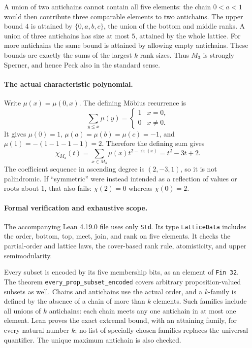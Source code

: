 \documentclass[11pt]{article}
\begin{document}
A union of two antichains cannot contain all five elements: the chain
$0<a<1$ would then contribute three comparable elements to two
antichains.  The upper bound $4$ is attained by
$\{0,a,b,c\}$, the union of the bottom and middle ranks.
A union of three antichains has size at most $5$, attained by the
whole lattice.  For more antichains the same bound is attained by
allowing empty antichains.  These bounds are exactly the sums of the
largest $k$ rank sizes.  Thus $M_3$ is strongly Sperner, and hence
Peck also in the standard sense.

\paragraph{The actual characteristic polynomial.}
Write $\mu(x)=\mu(0,x)$.  The defining M\"obius recurrence is
\[
\sum_{y\leq x}\mu(y)=
\begin{cases}1&x=0,\\0&x\ne0.\end{cases}
\]
It gives $\mu(0)=1$, $\mu(a)=\mu(b)=\mu(c)=-1$, and
$\mu(1)=-(1-1-1-1)=2$.  Therefore the defining sum gives
\[
\chi_{M_3}(t)=\sum_{x\in M_3}\mu(x)t^{2-\operatorname{rk}(x)}
=t^2-3t+2.
\]
The coefficient sequence in ascending degree is $(2,-3,1)$, so it
is not palindromic.  If ``symmetric'' were instead intended as a
reflection of values or roots about $1$, that also fails:
$\chi(2)=0$ whereas $\chi(0)=2$.

\paragraph{Formal verification and exhaustive scope.}
The accompanying Lean 4.19.0 file uses only \texttt{Std}.  Its type
\texttt{LatticeData} includes the order, bottom, top, meet, join, and
rank on five elements.  It checks the partial-order and lattice laws,
the cover-based rank rule, atomisticity, and upper semimodularity.

Every subset is encoded by its five membership bits, as an element of
\texttt{Fin 32}.  The theorem
\texttt{every\_prop\_subset\_encoded} covers arbitrary
proposition-valued subsets as well.  Chains and antichains use the
actual order, and a $k$-family is defined by the absence of a chain
of more than $k$ elements.  Such families include all unions of $k$
antichains: each chain meets any one antichain in at most one element.
Lean proves the exact extremal bound, with an attaining family, for
every natural number $k$; no list of specially chosen families replaces
the universal quantifier.  The unique maximum antichain is also checked.
\end{document}
